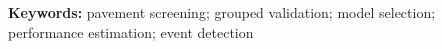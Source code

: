 \begin{abstract}

\end{abstract}
\noindent\textbf{Keywords:} pavement screening; grouped validation; model selection; performance estimation; event detection
\par\medskip
\linenumbers

\nolinenumbers
\begin{singlespace}\small

\end{singlespace}
\clearpage





\clearpage

